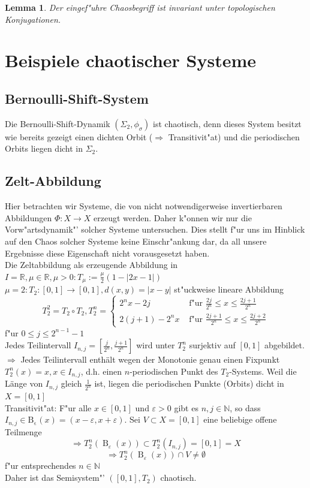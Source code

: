 \documentclass[a4paper, 13pt]{scrreprt}
\newtheorem{lemma}[theorem]{Lemma}
\theoremstyle{definition} \newtheorem{definition}{Definition}[section]
\begin{document}
\begin{lemma}\label{chaos_invariant_top_konj}
Der eingef"uhre Chaosbegriff ist invariant unter topologischen Konjugationen.
\end{lemma}

\section{Beispiele chaotischer Systeme}
\subsection{Bernoulli-Shift-System}
Die Bernoulli-Shift-Dynamik $(\Sigma_2,\phi_\sigma)$ ist chaotisch, denn dieses System besitzt wie bereits gezeigt einen dichten Orbit ($\Rightarrow$ Transitivit"at) und die periodischen Orbits liegen dicht in $\Sigma_2$.

\subsection{\glqq Zelt\grqq-Abbildung}
Hier betrachten wir Systeme, die von nicht notwendigerweise invertierbaren Abbildungen $\Phi:X\rightarrow X$ erzeugt werden. Daher k"onnen wir nur die \glqq Vorw"artsdynamik"' solcher Systeme untersuchen. Dies stellt f"ur uns im Hinblick auf den Chaos solcher Systeme keine Einschr"ankung dar, da all unsere Ergebnisse diese Eigenschaft nicht vorausgesetzt haben. \\
Die Zeltabbildung als erzeugende Abbildung in $I=\mathbb{R}, \mu\in\mathbb{R}, \mu>0: T_{\mu}:= \frac{\mu} 2 (1-|2x-1|)$
$\mu=2: T_2:[0,1]\rightarrow[0,1], d(x,y)=|x-y|$ st"uckweise lineare Abbildung
\[T_2^2=T_2\circ T_2,
T_2^n=
\begin{cases}
2^n x-2j & \text{ f"ur } \frac{2j}{2^n}\leq x\leq \frac{2j+1}{2^n}\\
2(j+1)-2^n x & \text{ f"ur } \frac{2j+1}{2^n} \leq x\leq \frac{2j+2}{2^n}
\end{cases}\]
f"ur $0\leq j\leq 2^{n-1}-1$\\
Jedes Teilintervall $I_{n,j}=[\frac j {2^n}, \frac{j+1}{2^n}]$ wird unter $T_2^n$ surjektiv auf $[0,1]$ abgebildet.\\
$\Rightarrow$ Jedes Teilintervall enthält wegen der Monotonie genau einen Fixpunkt $T_2^n(x)=x, x\in I_{n,j}$, d.h. einen $n$-periodischen Punkt des $T_2$-Systems. Weil die Länge von $I_{n,j}$ gleich $\frac 1 {2^n}$ ist, liegen die periodischen Punkte (Orbits) dicht in $X=[0,1]$\\
Transitivit"at: F"ur alle $x\in[0,1]$ und $\varepsilon>0$ gibt es $n,j\in\mathbb{N}$, so dass $I_{n,j}\in\operatorname{B_{\varepsilon}}(x)=(x-\varepsilon,x+\varepsilon)$. Sei $V\subset X=[0,1]$ eine beliebige offene Teilmenge
\[\Rightarrow T_2^n(\operatorname{B}_{\varepsilon}(x))\subset T_2^n(I_{n,j})=[0,1]=X\]
\[\Rightarrow T_2^n(\operatorname{B}_{\varepsilon}(x))\cap V\neq\emptyset\]
f"ur entsprechendes $n\in\mathbb{N}$\\
Daher ist das \glqq Semisystem"'  $([0,1],T_2)$ chaotisch.
\end{document}
